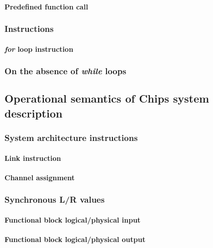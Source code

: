 \documentclass{article}
\begin{document}
\paragraph{Predefined function call}

\subsubsection{Instructions}

\paragraph{\emph{for} loop instruction}

\subsubsection{On the absence of \emph{while} loops}

\subsection{Operational semantics of Chips system description}\label{systemos}

\subsubsection{System architecture instructions}

\paragraph{Link instruction}

\paragraph{Channel assignment}

\subsubsection{Synchronous L/R values}

\paragraph{Functional block logical/physical input}

\paragraph{Functional block logical/physical output}
\end{document}
